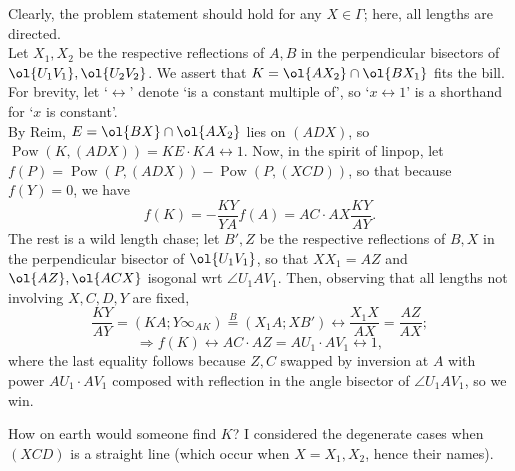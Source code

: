 \documentclass{seto}
\DeclareMathOperator\Pow{Pow}
\begin{document}
Clearly, the problem statement should hold for any $X\in\Gamma$; here, all lengths are directed.\\ 
Let $X_1,X_2$ be the respective reflections of $A,B$ in the perpendicular
bisectors of $\ol{U_1V_1},\ol{U_2V_2}$. We assert that
$K=\ol{AX_2}\cap\ol{BX_1}$ fits the bill. For brevity, let `$\leftrightarrow$'
denote `is a constant multiple of', so `$x\leftrightarrow 1$' is a shorthand for
`$x$ is constant'. \\[4pt] 
By Reim, $E=\ol{BX}\cap\ol{AX_2}$ lies on $(ADX)$, so $\Pow(K,(ADX))=KE\cdot
KA\leftrightarrow 1$. Now, in the spirit of linpop, let
$f(P)=\Pow(P,(ADX))-\Pow(P,(XCD))$, so that because $f(Y)=0$, we have 
\[f(K)=-\frac{KY}{YA}f(A)=AC\cdot AX\frac{KY}{AY}.\] 
The rest is a wild length
chase; let $B',Z$ be the respective reflections of $B,X$ in the perpendicular
bisector of $\ol{U_1V_1}$, so that $XX_1=AZ$ and $\ol{AZ},\ol{ACX}$ isogonal wrt
$\angle U_1AV_1$. Then, observing that all lengths not involving $X,C,D,Y$ are
fixed, \[\frac{KY}{AY}=(KA;Y\infty_{AK})\overset B=(X_1A;XB') \leftrightarrow
\frac{X_1X}{AX}=\frac{AZ}{AX};\] 
\[\Rightarrow f(K)\leftrightarrow AC\cdot AZ=AU_1\cdot AV_1\leftrightarrow 1,\]
where the last equality follows because $Z,C$ swapped by inversion at $A$ with power $AU_1\cdot AV_1$ composed with reflection in the angle bisector of $\angle U_1AV_1$, so we win.
\begin{remark} How on earth would someone find $K$? 
I considered the degenerate cases when $(XCD)$ is a straight line (which occur when $X=X_1,X_2$, hence their names). \end{remark}
\end{document}
